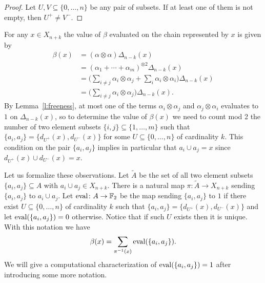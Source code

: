 \begin{proof}
	Let $U, V \subseteq \{0, \dots, n\}$ be any pair of subsets. If at least one of them is not empty, then $U^+ \neq V^-$.
\end{proof}

For any $x \in X_{n+k}$ the value of $\beta$ evaluated on the chain represented by $x$ is given by 
\begin{align*}
\beta(x) & =
(\alpha \otimes \alpha) \Delta_{n-k}(x) \\ & =
(\alpha_1 + \cdots + \alpha_m)^{\otimes 2} \Delta_{n-k}(x) \\ & =
\Big(\sum_{i \neq j} \alpha_i \otimes \alpha_j + \sum_{i} \alpha_i \otimes \alpha_i \Big)
\Delta_{n-k}(x) \\ & =
\Big(\sum_{i \neq j} \alpha_i \otimes \alpha_j\Big)
\Delta_{n-k}(x).
\end{align*}
By Lemma~\ref{l:freeness}, at most one of the terms $\alpha_i \otimes \alpha_j$ and $\alpha_j \otimes \alpha_i$ evaluates to $1$ on $\Delta_{n-k}(x)$, so to determine the value of $\beta(x)$ we need to count mod 2 the number of two element subsets $\{i,j\} \subseteq \{1,\dots, m\}$ such that $\{a_i, a_j\} = \{d_{U^+}(x), d_{U^-}(x)\}$ for some $U \subseteq \{0, \dots, n\}$ of cardinality $k$.
This condition on the pair $\{a_i, a_j\}$ implies in particular that $a_i \cup a_j = x$ since $d_{U^+}(x) \cup d_{U^-}(x) = x$.

Let us formalize these observations.
Let $\widetilde{A}$ be the set of all two element subsets $\{a_i, a_j\} \subseteq A$ with $a_i \cup a_j \in X_{n+k}$.
There is a natural map $\pi \colon \widetilde{A} \to X_{n+k}$ sending $\{a_i, a_j\}$ to $a_i \cup a_j$.
Let $\operatorname{eval} \colon A \to \mathbb{F}_2$ be the map sending $\{a_i, a_j\}$ to $1$ if there exist $U \subseteq \{0,\dots,n\}$ of cardinality $k$ such that $\{a_i, a_j\} = \{d_{U^+}(x), d_{U^-}(x)\}$ and let $\operatorname{eval}(\{a_i, a_j\}) = 0$ otherwise.
Notice that if such $U$ exists then it is unique.
With this notation we have
\begin{equation*}
\beta(x) = \sum_{\pi^{-1}(x)} \operatorname{eval}(\{a_i, a_j\}).
\end{equation*}
We will give a computational characterization of $\operatorname{eval}(\{a_i, a_j\}) = 1$ after introducing some more notation.

